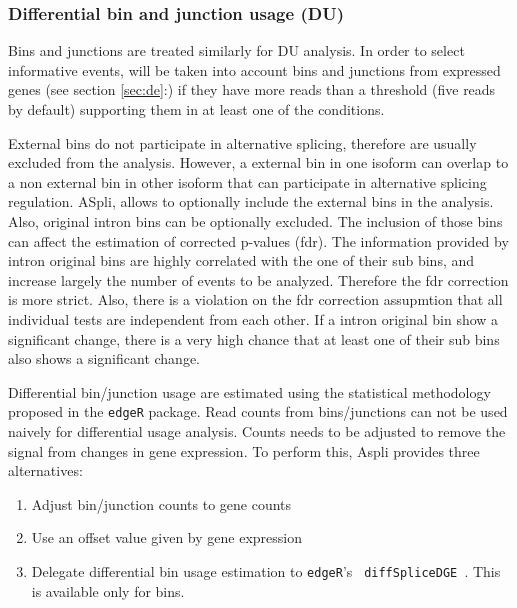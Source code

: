 \documentclass{article}
\newcommand{\secref}[1]{\ref{#1}:\nameref{#1}}
\begin{document}


\subsubsection{Differential bin and junction usage (DU)}
\label{sec:du}

Bins and junctions are treated similarly for DU analysis. 
In order to select informative events, will be taken into account bins and
junctions from expressed genes (see section \secref{sec:de}) if they have more
reads than a threshold (five reads by default) supporting them in at least one of the 
conditions. 

External bins do not participate in alternative splicing, therefore are usually
excluded from the analysis. However, a external bin in one isoform can overlap
to a non external bin in other isoform that can participate in alternative
splicing regulation. ASpli, allows to optionally include the external bins in
the analysis. Also, original intron bins can be optionally excluded. The
inclusion of those bins can affect the estimation of corrected p-values (fdr).
The information provided by intron original bins are highly correlated
with the one of their sub bins, and increase largely the number of
events to be analyzed. Therefore the fdr correction is more strict. Also, there
is a violation on the fdr correction assupmtion that all individual tests are
independent from each other. If a intron original bin show a significant change,
there is a very high chance that at least one of their sub bins also shows a
significant change.

Differential bin/junction usage are estimated using the statistical methodology
proposed in the \texttt{edgeR} package. Read counts from bins/junctions can not
be used naively for differential usage analysis. Counts needs to be adjusted
to remove the signal from changes in gene expression. To perform this, Aspli 
provides three alternatives: 

\begin{enumerate}
   \item Adjust bin/junction counts to gene counts
   \item Use an offset value given by gene expression
   \item Delegate differential bin usage estimation to \texttt{edgeR}'s 
         \texttt{ diffSpliceDGE }. This is available only for bins.
\end{enumerate}
\end{document}
